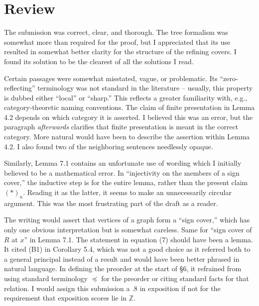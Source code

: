 \documentclass[11pt]{article}
\theoremstyle{definition}
\theoremstyle{remark}
\begin{document}
\maketitle

\section{Review}

The submission was correct, clear, and thorough. The tree formalism was somewhat more than required for the proof, but I appreciated that its use resulted in somewhat better clarity for the structure of the refining covers. I found its solution to be the clearest of all the solutions I read. 

Certain passages were somewhat misstated, vague, or problematic. Its ``zero-reflecting'' terminology was not standard in the literature -- usually, this property is dubbed either ``local'' or ``sharp.'' This reflects a greater familiarity with, e.g., category-theoretic naming conventions. The claim of finite presentation in Lemma 4.2 depends on which category it is asserted. I believed this was an error, but the paragraph \emph{afterwards} clarifies that finite presentation is meant in the correct category. More natural would have been to describe the assertion within Lemma 4.2. I also found two of the neighboring sentences needlessly opaque. 

Similarly, Lemma 7.1 contains an unfortunate use of wording which I initially believed to be a mathematical error. In ``injectivity on the members of a sign cover,'' the inductive step is for the entire lemma, rather than the present claim $(*)_n$. Reading it as the latter, it seems to make an unnecessarily circular argument. This was the most frustrating part of the draft as a reader. 

The writing would assert that vertices of a graph form a ``sign cover,'' which has only one obvious interpretation but is somewhat careless. Same for ``sign cover of $R$ at $x$'' in Lemma 7.1. The statement in equation (7) should have been a lemma. It cited (B1) in Corollary 5.4, which was not a good choice as it referred both to a general principal instead of a result and would have been better phrased in natural language. In defining the preorder at the start of \S 6, it refrained from using standard terminology $\preceq$ for the preorder or citing standard facts for that relation. I would assign this submission a .8 in exposition if not for the requirement that exposition scores lie in $\mathbb Z$. 
\end{document}
